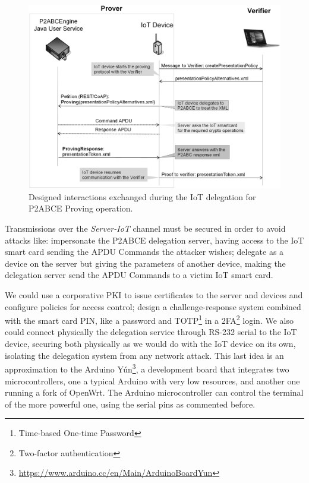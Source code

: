 \documentclass[journal]{IEEEtran}
\begin{document}
\begin{figure}[bth]
	\begin{center}
		\includegraphics[width=\linewidth]{gfx/UML/DelegationProving}
	\end{center}
	\caption{Designed interactions exchanged during the IoT delegation for P2ABCE Proving operation.}
	\label{fig:DelegationProving}
\end{figure}

Transmissions over the \textit{Server-IoT} channel must be secured in order to avoid attacks like: impersonate the P2ABCE delegation server, having access to the IoT smart card sending the APDU Commands the attacker wishes; delegate as a device on the server but giving the parameters of another device, making the delegation server send the APDU Commands to a victim IoT smart card.


We could use a corporative PKI to issue certificates to the server and devices and configure policies for access control; design a challenge-response system combined with the smart card PIN, like a password and TOTP\footnote{Time-based One-time Password} in a 2FA\footnote{Two-factor authentication} login. We also could connect physically the delegation service through RS-232 serial to the IoT device, securing both physically as we would do with the IoT device on its own, isolating the delegation system from any network attack. This last idea is an approximation to the Arduino Yún\footnote{\url{https://www.arduino.cc/en/Main/ArduinoBoardYun}}, a development board that integrates two microcontrollers, one a typical Arduino with very low resources, and another one running a fork of OpenWrt. The Arduino microcontroller can control the terminal of the more powerful one, using the serial pins as commented before.
\end{document}
